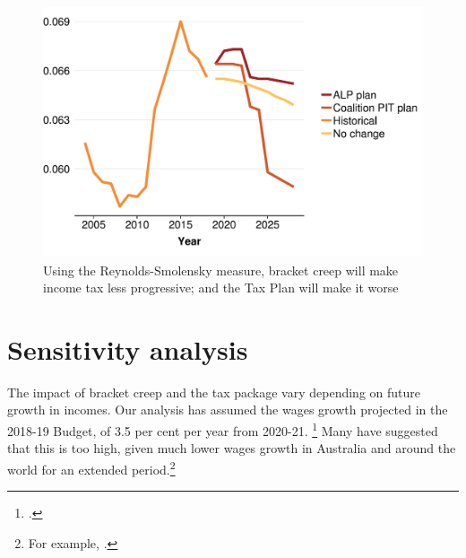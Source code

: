 \documentclass[submission]{grattan}\usepackage[]{graphicx}\usepackage[]{color}
\newenvironment{knitrout}{}{} %
\begin{document}
\begin{figure}
\caption{Using the Reynolds-Smolensky measure, bracket creep will make income tax less progressive; and the Tax Plan will make it worse}\label{fig:progressivity}
\begin{knitrout}
\color{fgcolor}
\includegraphics[width=4.47222in,height=2.92631723826715in]{atlas/progressivities-1} 

\end{knitrout}
\end{figure}

\section{Sensitivity analysis}\label{sec:sensitivity-analysis}

The impact of bracket creep and the tax package vary depending on future growth in incomes. Our analysis has assumed the wages growth projected in the 2018-19 Budget, of 3.5 per cent per year from 2020-21.%
  \footcite[][1--10]{Treasury2018a}
Many have suggested that this is too high, given much lower wages growth in Australia and around the world for an extended period.\footnote{For example, \textcite{Knaus}.}
\end{document}

